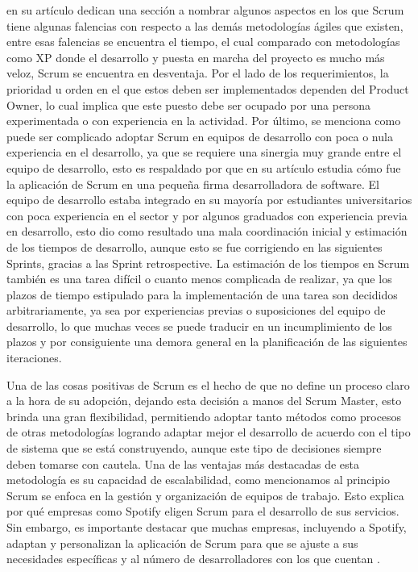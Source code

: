 \documentclass[a4paper,10pt]{article}
\begin{document}
	\textcite{rodriguez2015que} en su artículo dedican una sección a nombrar algunos aspectos en los que Scrum tiene algunas falencias con respecto a las demás metodologías ágiles que existen, entre esas falencias se encuentra el tiempo, el cual comparado con metodologías como XP donde el desarrollo y puesta en marcha del proyecto es mucho más veloz, Scrum se encuentra en desventaja. Por el lado de los requerimientos, la prioridad u orden en el que estos deben ser implementados dependen del Product Owner, lo cual implica que este puesto debe ser ocupado por una persona experimentada o con experiencia en la actividad. Por último, se menciona como puede ser complicado adoptar Scrum en equipos de desarrollo con poca o nula experiencia en el desarrollo, ya que se requiere una sinergia muy grande entre el equipo de desarrollo, esto es respaldado por \textcite{barrios2012scrum} que en su artículo estudia cómo fue la aplicación de Scrum en una pequeña firma desarrolladora de software. El equipo de desarrollo estaba integrado en su mayoría por estudiantes universitarios con poca experiencia en el sector y por algunos graduados con experiencia previa en desarrollo, esto dio como resultado una mala coordinación inicial y estimación de los tiempos de desarrollo, aunque esto se fue corrigiendo en las siguientes Sprints, gracias a las Sprint retrospective. La estimación de los tiempos en Scrum también es una tarea difícil o cuanto menos complicada de realizar, ya que los plazos de tiempo estipulado para la implementación de una tarea son decididos arbitrariamente, ya sea por experiencias previas o suposiciones del equipo de desarrollo, lo que muchas veces se puede traducir en un incumplimiento de los plazos y por consiguiente una demora general en la planificación de las siguientes iteraciones.
	
	Una de las cosas positivas de Scrum es el hecho de que no define un proceso claro a la hora de su adopción, dejando esta decisión a manos del Scrum Master, esto brinda una gran flexibilidad, permitiendo adoptar tanto métodos como procesos de otras metodologías logrando adaptar mejor el desarrollo de acuerdo con el tipo de sistema que se está construyendo, aunque este tipo de decisiones siempre deben tomarse con cautela. Una de las ventajas más destacadas de esta metodología es su capacidad de escalabilidad, como mencionamos al principio Scrum se enfoca en la gestión y organización de equipos de trabajo. Esto explica por qué empresas como Spotify eligen Scrum para el desarrollo de sus servicios. Sin embargo, es importante destacar que muchas empresas, incluyendo a Spotify, adaptan y personalizan la aplicación de Scrum para que se ajuste a sus necesidades específicas y al número de desarrolladores con los que cuentan \parencite{kniberg2012scaling}.
\end{document}

